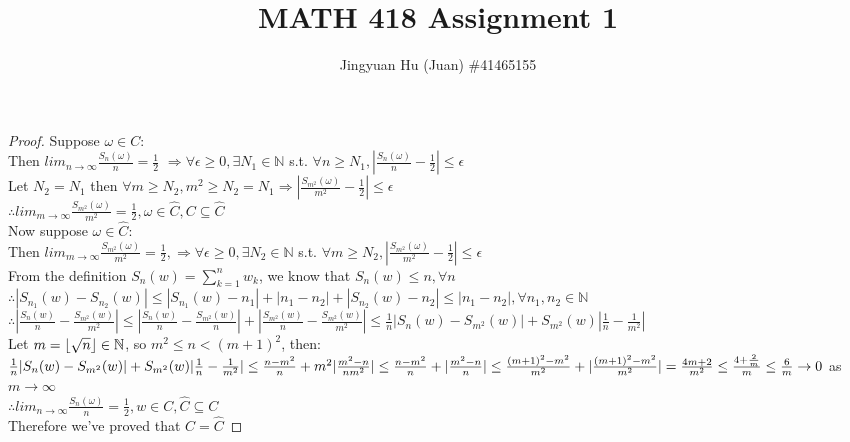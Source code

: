\documentclass[12pt]{article}
\DeclarePairedDelimiter\floor{\lfloor}{\rfloor}
\newenvironment{problem}[2][Problem]{\begin{trivlist}
\item[\hskip \labelsep {\bfseries #1}\hskip \labelsep {\bfseries #2.}]}{\end{trivlist}}
\begin{document}
 
\title{\vspace{-1.6cm}\large MATH 418 Assignment 1}
\author{\large Jingyuan Hu (Juan) \#41465155}
\date{}
\maketitle
 
\begin{problem}{1}
\end{problem}
 
\begin{proof}
Suppose $\omega \in C:$\\
Then $lim_{n\rightarrow \infty} \frac{S_{n}(\omega)}{n}=\frac{1}{2}$
$\Rightarrow \forall \epsilon \ge 0, \exists N_{1} \in \mathbb{N}$ s.t. $\forall n \ge N_{1}, |\frac{S_{n}(\omega)}{n} - \frac{1}{2}| \le \epsilon$ \\
Let $N_{2} = N_{1}$ then $\forall m \ge N_{2}, m^2 \ge N_{2}=N_{1} \Rightarrow |\frac{S_{m^2}(\omega)}{m^2} - \frac{1}{2}| \le \epsilon$\\
$\therefore lim_{m\rightarrow \infty} \frac{S_{m^2}(\omega)}{m^2}=\frac{1}{2}, \omega \in \hat{C}, C \subseteq \hat{C}$\\
Now suppose $\omega \in \hat{C}$:\\
Then $lim_{m\rightarrow \infty} \frac{S_{m^2}(\omega)}{m^2}=\frac{1}{2}, \Rightarrow \forall \epsilon \ge 0, \exists N_{2} \in \mathbb{N}$ s.t. $\forall m \ge N_{2}, |\frac{S_{m^2}(\omega)}{m^2} - \frac{1}{2}| \le \epsilon$\\
From the definition $S_{n}(w) = \sum_{k=1}^{n}w_{k}$, we know that $S_{n}(w) \le n, \forall n$\\
$\therefore |S_{n_{1}}(w) - S_{n_{2}}(w)| \le |S_{n_{1}}(w) - n_{1}| + |n_{1} - n_{2}| + |S_{n_{2}}(w) - n_{2}| \le |n_{1} - n_{2}|, \forall n_{1}, n_{2} \in \mathbb{N}$\\
$\therefore |\frac{S_{n}(w)}{n} - \frac{S_{m^2}(w)}{m^2}| \le |\frac{S_{n}(w)}{n} - \frac{S_{m^2}(w)}{n}| + |\frac{S_{m^2}(w)}{n} - \frac{S_{m^2}(w)}{m^2}| \le \frac{1}{n} |{S_{n}(w)} - {S_{m^2}(w)}| + S_{m^2}(w)|\frac{1}{n} - \frac{1}{m^2}|$\\
Let $m = \floor*{\sqrt{n}} \in \mathbb{N}$, so $m^{2} \le n < (m + 1)^2$, then:\\
$\frac{1}{n} |{S_{n}(w)} - {S_{m^2}(w)}| + S_{m^2}(w)|\frac{1}{n} - \frac{1}{m^2}| \le \frac{n-m^2}{n} + m^2|\frac{m^2-n}{nm^2}| \le \frac{n-m^2}{n} + |\frac{m^2-n}{n}| \\
\le \frac{(m+1)^2-m^2}{m^2} + |\frac{(m+1)^2-m^2}{m^2}| = \frac{4m+2}{m^2} \le \frac{4+\frac{2}{m}}{m} \le \frac{6}{m} \rightarrow 0$ as $m \rightarrow \infty$\\
$\therefore lim_{n\rightarrow \infty} \frac{S_{n}(\omega)}{n}=\frac{1}{2}, w \in C, \hat{C} \subseteq C$\\
Therefore we've proved that $C = \hat{C}$
\end{proof}
\end{document}
